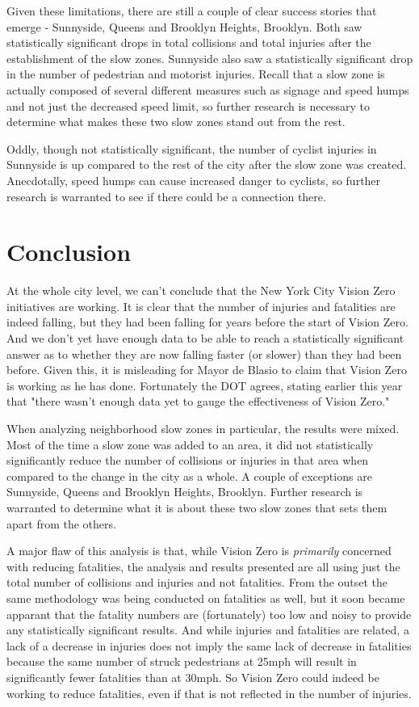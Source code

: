 \documentclass[10pt,journal,compsoc]{IEEEtran}
\begin{document}
Given these limitations, there are still a couple of clear success stories that emerge - Sunnyside, Queens and Brooklyn Heights, Brooklyn.  Both saw statistically significant drops in total collisions and total injuries after the establishment of the slow zones.  Sunnyside also saw a statistically significant drop in the number of pedestrian and motorist injuries.  Recall that a slow zone is actually composed of several different measures such as signage and speed humps and not just the decreased speed limit, so further research is necessary to determine what makes these two slow zones stand out from the rest.

Oddly, though not statistically significant, the number of cyclist injuries in Sunnyside is up compared to the rest of the city after the slow zone  was created.  Anecdotally, speed humps can cause increased danger to cyclists, so further research is warranted to see if there could be a connection there. 

\section{Conclusion}
At the whole city level, we can't conclude that the New York City Vision Zero initiatives are working.  It is clear that the number of injuries and fatalities are indeed falling, but they had been falling for years before the start of Vision Zero.  And we don't yet have enough data to be able to reach a statistically significant answer as to whether they are now falling faster (or slower) than they had been before.  Given this, it is misleading for Mayor de Blasio to claim that Vision Zero is working as he has done.  Fortunately the DOT agrees, stating earlier this year that "there wasn't enough data yet to gauge the effectiveness of Vision Zero." \cite{news}

When analyzing neighborhood slow zones in particular, the results were mixed.  Most of the time a slow zone  was added to an area, it did not statistically significantly reduce the number of collisions or injuries in that area when compared to the change in the city as a whole.  A couple of exceptions are Sunnyside, Queens and Brooklyn Heights, Brooklyn. Further research is warranted to determine what it is about these two slow zones that sets them apart from the others.

A major flaw of this analysis is that, while Vision Zero is \textit{primarily} concerned with reducing fatalities, the analysis and results presented are all using just the total number of collisions and injuries and not fatalities.  From the outset the same methodology was being conducted on fatalities as well, but it soon became apparant that the fatality numbers are (fortunately) too low and noisy to provide any statistically significant results.  And while injuries and fatalities are related, a lack of a decrease in injuries does not imply the same lack of decrease in fatalities because the same number of struck pedestrians at 25mph will result in significantly fewer fatalities than at 30mph. So Vision Zero could indeed  be working to reduce fatalities, even if that is not reflected in the number of injuries.
\end{document}
